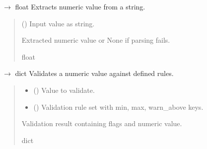 \documentclass[letterpaper,10pt,english]{sphinxmanual}
\begin{document}
\begin{fulllineitems}
\label{\detokenize{autoapi/modules/input/postprocess/index:modules.input.postprocess.extract_numeric}}
\pysigstartsignatures
\pysiglinewithargsret
{}
{}
{{ $\rightarrow$ float}}
\pysigstopsignatures
\sphinxAtStartPar
Extracts numeric value from a string.
\begin{quote}\begin{description}
\sphinxAtStartPar
{} () \textendash{} Input value as string.

\sphinxAtStartPar
Extracted numeric value or None if parsing fails.

\sphinxAtStartPar
float

\end{description}\end{quote}

\end{fulllineitems}


\begin{fulllineitems}
\label{\detokenize{autoapi/modules/input/postprocess/index:modules.input.postprocess.validate_value}}
\pysigstartsignatures
\pysiglinewithargsret
{}
{\sphinxparamcomma {}}
{{ $\rightarrow$ dict}}
\pysigstopsignatures
\sphinxAtStartPar
Validates a numeric value against defined rules.
\begin{quote}\begin{description}
\begin{itemize}
\item {} 
\sphinxAtStartPar
{} () \textendash{} Value to validate.

\item {} 
\sphinxAtStartPar
{} () \textendash{} Validation rule set with min, max, warn\_above keys.

\end{itemize}

\sphinxAtStartPar
Validation result containing flags and numeric value.

\sphinxAtStartPar
dict

\end{description}\end{quote}

\end{fulllineitems}
\end{document}
